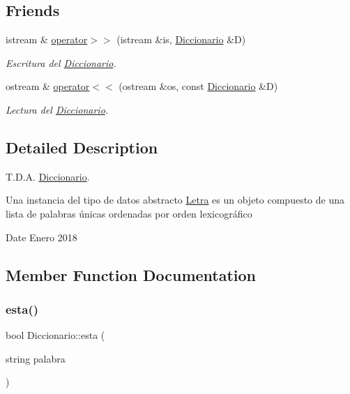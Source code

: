 \subsection*{Friends}
\begin{DoxyCompactItemize}
\item 
istream \& \mbox{\hyperlink{classDiccionario_a940c6d9371bca891c95a5a044a42905f}{operator$>$$>$}} (istream \&is, \mbox{\hyperlink{classDiccionario}{Diccionario}} \&D)
\begin{DoxyCompactList}\small\item\em Escritura del \mbox{\hyperlink{classDiccionario}{Diccionario}}. \end{DoxyCompactList}\item 
ostream \& \mbox{\hyperlink{classDiccionario_aad8d25118e38f63c35cfc247af45a78a}{operator$<$$<$}} (ostream \&os, const \mbox{\hyperlink{classDiccionario}{Diccionario}} \&D)
\begin{DoxyCompactList}\small\item\em Lectura del \mbox{\hyperlink{classDiccionario}{Diccionario}}. \end{DoxyCompactList}\end{DoxyCompactItemize}


\subsection{Detailed Description}
T.\+D.\+A. \mbox{\hyperlink{classDiccionario}{Diccionario}}. 

Una instancia del tipo de datos abstracto {\ttfamily \mbox{\hyperlink{classLetra}{Letra}}} es un objeto compuesto de una lista de palabras únicas ordenadas por orden lexicográfico

\begin{DoxyDate}{Date}
Enero 2018 
\end{DoxyDate}


\subsection{Member Function Documentation}
\mbox{\label{classDiccionario_a15c42990a5b7d00bc9522ab5e4847bcb}} 
\subsubsection{\texorpdfstring{esta()}{esta()}}
{\footnotesize\ttfamily bool Diccionario\+::esta (\begin{DoxyParamCaption}\item[{string}]{palabra }\end{DoxyParamCaption})}



